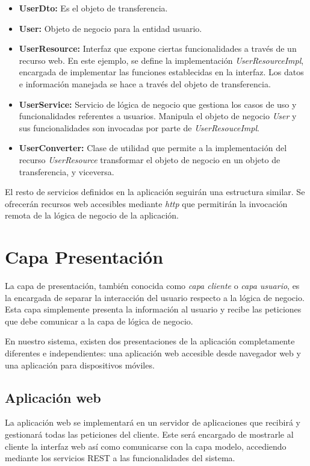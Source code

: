 \begin{itemize}
	\item \textbf{UserDto: } Es el objeto de transferencia.
	\item \textbf{User: } Objeto de negocio para la entidad usuario.
	\item \textbf{UserResource: } Interfaz que expone ciertas funcionalidades a través de un recurso web. En este ejemplo, se define la implementación \textit{UserResourceImpl}, encargada de implementar las funciones establecidas en la interfaz. Los datos e información manejada se hace a través del objeto de transferencia.
	\item \textbf{UserService: } Servicio de lógica de negocio que gestiona los casos de uso y funcionalidades referentes a usuarios. Manipula el objeto de negocio \textit{User} y sus funcionalidades son invocadas por parte de \textit{UserResouceImpl}.
	\item \textbf{UserConverter: } Clase de utilidad que permite a la implementación del recurso \textit{UserResource} transformar el objeto de negocio en un objeto de transferencia, y viceversa.

\end{itemize}

El resto de servicios definidos en la aplicación seguirán una estructura similar. Se ofrecerán recursos web accesibles mediante \textit{http} que permitirán la invocación remota de la lógica de negocio de la aplicación.


\newpage
\section{Capa Presentación}
La capa de presentación, también conocida como \textit{capa cliente} o \textit{capa usuario}, es la encargada de separar la interacción del usuario respecto a la lógica de negocio. Esta capa simplemente presenta la información al usuario y recibe las peticiones que debe comunicar a la capa de lógica de negocio.

En nuestro sistema, existen dos presentaciones de la aplicación completamente diferentes e independientes: una aplicación web accesible desde navegador web y una aplicación para dispositivos móviles.

\subsection{Aplicación web}
La aplicación web se implementará en un servidor de aplicaciones que recibirá y gestionará todas las peticiones del cliente. Este será encargado de mostrarle al cliente la interfaz web así como comunicarse con la capa modelo, accediendo mediante los servicios REST a las funcionalidades del sistema.

